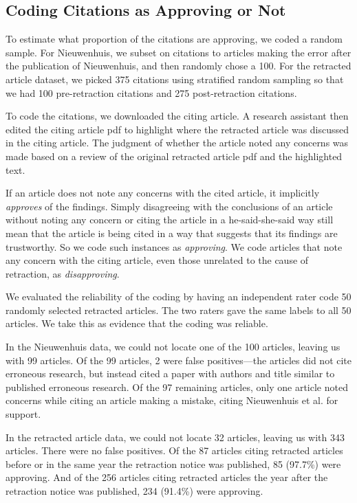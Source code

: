 \documentclass[12pt]{article}
\begin{document}
\subsection*{Coding Citations as Approving or Not}
\label{approving_or_not}
To estimate what proportion of the citations are approving, we coded a random sample. For Nieuwenhuis, we subset on citations to articles making the error after the publication of Nieuwenhuis, and then randomly chose a 100. For the retracted article dataset, we picked 375 citations using stratified random sampling so that we had 100 pre-retraction citations and 275 post-retraction citations. 

To code the citations, we downloaded the citing article. A research assistant then edited the citing article pdf to highlight where the retracted article was discussed in the citing article. The judgment of whether the article noted any concerns was made based on a review of the original retracted article pdf and the highlighted text. 

If an article does not note any concerns with the cited article, it implicitly \textit{approves} of the findings. Simply disagreeing with the conclusions of an article without noting any concern or citing the article in a he-said-she-said way still mean that the article is being cited in a way that suggests that its findings are trustworthy. So we code such instances as \textit{approving}. We code articles that note any concern with the citing article, even those unrelated to the cause of retraction, as \textit{disapproving}. 

We evaluated the reliability of the coding by having an independent rater code 50 randomly selected retracted articles. The two raters gave the same labels to all 50 articles. We take this as evidence that the coding was reliable.

In the Nieuwenhuis data, we could not locate one of the 100 articles, leaving us with 99 articles. Of the 99 articles, 2 were false positives---the articles did not cite erroneous research, but instead cited a paper with authors and title similar to published erroneous research. Of the 97 remaining articles, only one article noted concerns while citing an article making a mistake, citing Nieuwenhuis et al. \cite{nieuwenhuis2011} for support. 

In the retracted article data, we could not locate 32 articles, leaving us with 343 articles. There were no false positives. Of the 87 articles citing retracted articles before or in the same year the retraction notice was published, 85 (97.7\%) were approving. And of the 256 articles citing retracted articles the year after the retraction notice was published, 234 (91.4\%) were approving.
\end{document}
